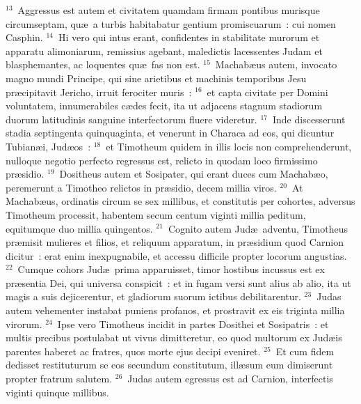 ${}^{13}$~Aggressus est autem et civitatem quamdam firmam pontibus murisque circumseptam, qu\ae\ a turbis habitabatur gentium promiscuarum~: cui nomen Casphin.
${}^{14}$~Hi vero qui intus erant, confidentes in stabilitate murorum et apparatu alimoniarum, remissius agebant, maledictis lacessentes Judam et blasphemantes, ac loquentes qu\ae\ fas non est.
${}^{15}$~Machab\ae us autem, invocato magno mundi Principe, qui sine arietibus et machinis temporibus Jesu pr\ae cipitavit Jericho, irruit ferociter muris~:
${}^{16}$~et capta civitate per Domini voluntatem, innumerabiles c\ae des fecit, ita ut adjacens stagnum stadiorum duorum latitudinis sanguine interfectorum fluere videretur.
${}^{17}$~Inde discesserunt stadia septingenta quinquaginta, et venerunt in Characa ad eos, qui dicuntur Tubian\ae i, Jud\ae os~:
${}^{18}$~et Timotheum quidem in illis locis non comprehenderunt, nulloque negotio perfecto regressus est, relicto in quodam loco firmissimo pr\ae sidio.
${}^{19}$~Dositheus autem et Sosipater, qui erant duces cum Machab\ae o, peremerunt a Timotheo relictos in pr\ae sidio, decem millia viros.
${}^{20}$~At Machab\ae us, ordinatis circum se sex millibus, et constitutis per cohortes, adversus Timotheum processit, habentem secum centum viginti millia peditum, equitumque duo millia quingentos.
${}^{21}$~Cognito autem Jud\ae\ adventu, Timotheus pr\ae misit mulieres et filios, et reliquum apparatum, in pr\ae sidium quod Carnion dicitur~: erat enim inexpugnabile, et accessu difficile propter locorum angustias.
${}^{22}$~Cumque cohors Jud\ae\ prima apparuisset, timor hostibus incussus est ex pr\ae sentia Dei, qui universa conspicit~: et in fugam versi sunt alius ab alio, ita ut magis a suis dejicerentur, et gladiorum suorum ictibus debilitarentur.
${}^{23}$~Judas autem vehementer instabat puniens profanos, et prostravit ex eis triginta millia virorum.
${}^{24}$~Ipse vero Timotheus incidit in partes Dosithei et Sosipatris~: et multis precibus postulabat ut vivus dimitteretur, eo quod multorum ex Jud\ae is parentes haberet ac fratres, quos morte ejus decipi eveniret.
${}^{25}$~Et cum fidem dedisset restituturum se eos secundum constitutum, ill\ae sum eum dimiserunt propter fratrum salutem.
${}^{26}$~Judas autem egressus est ad Carnion, interfectis viginti quinque millibus.


